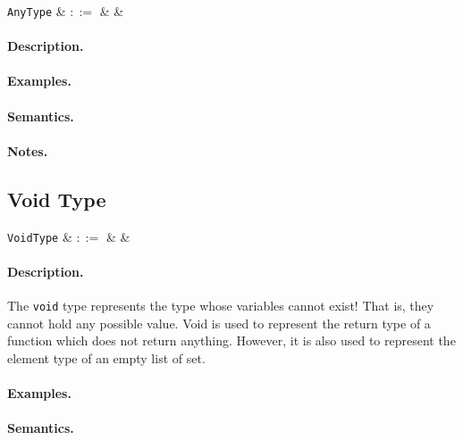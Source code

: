 \begin{syntax}
  \verb+AnyType+ & $::=$ &  &\\
\end{syntax}

\paragraph{Description.}

\paragraph{Examples.}

\paragraph{Semantics.}

\paragraph{Notes.} 


\subsection{Void Type}

\begin{syntax}
   \verb+VoidType+ & $::=$ &  &\\
\end{syntax}

\paragraph{Description.} The \lstinline{void} type represents the type whose variables cannot exist! That is, they cannot hold any possible value. Void is used to represent the return type of a function which does not return anything. However, it is also
used to represent the element type of an empty list of set. 

\paragraph{Examples.}

\paragraph{Semantics.}

